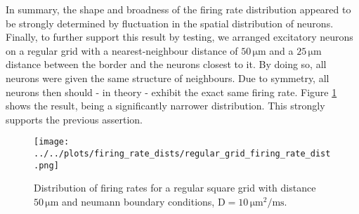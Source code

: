 \documentclass[10pt,a4paper]{article}
\begin{document}
In summary, the shape and broadness of the firing rate distribution appeared to be strongly determined by fluctuation in the spatial distribution of neurons. Finally, to further support this result by testing, we arranged excitatory neurons on a regular grid with a nearest-neighbour distance of $\mathrm{50\, \mu m}$ and a $\mathrm{25\, \mu m}$ distance between the border and the neurons closest to it. By doing so, all neurons were given the same structure of neighbours. Due to symmetry, all neurons then should - in theory - exhibit the exact same firing rate. Figure \ref{Fir_Rate_Dist_Reg_Grid} shows the result, being a significantly narrower distribution. This strongly supports the previous assertion.
\begin{figure}
\begin{center}
\texttt{[image: ../../plots/firing\_rate\_dists/regular\_grid\_firing\_rate\_dist.png]}
\end{center}
\caption{Distribution of firing rates for a regular square grid with distance $\mathrm{50\, \mu m}$ and neumann boundary conditions, $\mathrm{D=10\,\mu m^2/ms}$.}
\label{Fir_Rate_Dist_Reg_Grid}
\end{figure}  
\end{document}
